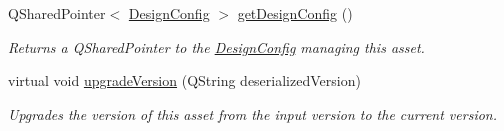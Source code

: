 \begin{DoxyCompactItemize}
Q\-Shared\-Pointer$<$ \hyperlink{class_picto_1_1_design_config}{Design\-Config} $>$ \hyperlink{class_picto_1_1_asset_a44b0ef3025e5bb5f0712fc176c769e5d}{get\-Design\-Config} ()
\begin{DoxyCompactList}\small\item\em Returns a Q\-Shared\-Pointer to the \hyperlink{class_picto_1_1_design_config}{Design\-Config} managing this asset. \end{DoxyCompactList}\item 
virtual void \hyperlink{class_picto_1_1_asset_aacaaedf9d76c3af2c7168d5c14fed914}{upgrade\-Version} (Q\-String deserialized\-Version)
\begin{DoxyCompactList}\small\item\em Upgrades the version of this asset from the input version to the current version. \end{DoxyCompactList}\end{DoxyCompactItemize}
